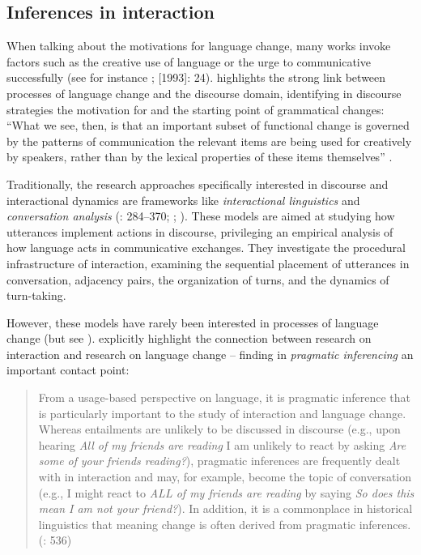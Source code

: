 \subsection{Inferences in interaction}
\hypertarget{Toc124860633}{}
When talking about the motivations for language change, many works invoke factors such as the creative use of language or the urge to communicative successfully (see for instance \citealt{Haspelmath1999}; \citealt{HopperTraugott2003} [1993]: 24). \citet{Waltereit2011,Waltereit2012} highlights the strong link between processes of language change and the discourse domain, identifying in discourse strategies the motivation for and the starting point of grammatical changes: “What we see, then, is that an important subset of functional change is governed by the patterns of communication the relevant items are being used for creatively by speakers, rather than by the lexical properties of these items themselves” \citep[65]{Waltereit2012}.

Traditionally, the research approaches specifically interested in discourse and interactional dynamics are frameworks like \textit{interactional linguistics} and \textit{conversation analysis} (\citealt{Levinson1983}: 284–370; \citealt{Clift2016}; \citealt{Couper-KuhlenSelting2017}). These models are aimed at studying how utterances implement actions in discourse, privileging an empirical analysis of how language acts in communicative exchanges. They investigate the procedural infrastructure of interaction, examining the sequential placement of utterances in conversation, adjacency pairs, the organization of turns, and the dynamics of turn-taking.

However, these models have rarely been interested in processes of language change (but see \citealt{Couper-Kuhlen2011}). \citet{EhmerRosemeyer2018} explicitly highlight the connection between research on interaction and research on language change – finding in \textit{pragmatic inferencing} an important contact point:

\begin{quote}
From a usage-based perspective on language, it is pragmatic inference that is particularly important to the study of interaction and language change. Whereas entailments are unlikely to be discussed in discourse (e.g., upon hearing \textit{All of my friends are reading} I am unlikely to react by asking \textit{Are some of} \textit{your friends reading?}), pragmatic inferences are frequently dealt with in interaction and may, for example, become the topic of conversation (e.g., I might react to \textit{ALL of my friends are reading} by saying \textit{So does this} \textit{mean I am not your friend?}). In addition, it is a commonplace in historical linguistics that meaning change is often derived from pragmatic inferences. (\citealt{EhmerRosemeyer2018}: 536)
\end{quote}

